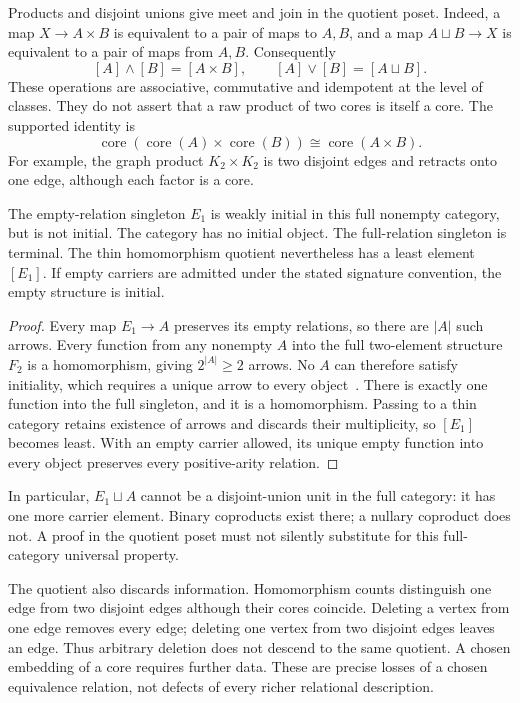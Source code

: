 Products and disjoint unions give meet and join in the quotient poset. Indeed, a map $X\to A\times B$ is equivalent to a pair of maps to $A,B$, and a map $A\sqcup B\to X$ is equivalent to a pair of maps from $A,B$. Consequently
\[
 [A]\wedge[B]=[A\times B],\qquad [A]\vee[B]=[A\sqcup B].
\]
These operations are associative, commutative and idempotent at the level of classes. They do not assert that a raw product of two cores is itself a core. The supported identity is
\[
 \operatorname{core}(\operatorname{core}(A)\times\operatorname{core}(B))
 \cong\operatorname{core}(A\times B).
\]
For example, the graph product $K_2\times K_2$ is two disjoint edges and retracts onto one edge, although each factor is a core.

\begin{proposition}
The empty-relation singleton $E_1$ is weakly initial in this full nonempty category, but is not initial. The category has no initial object. The full-relation singleton is terminal. The thin homomorphism quotient nevertheless has a least element $[E_1]$. If empty carriers are admitted under the stated signature convention, the empty structure is initial.
\end{proposition}
\begin{proof}
Every map $E_1\to A$ preserves its empty relations, so there are $|A|$ such arrows. Every function from any nonempty $A$ into the full two-element structure $F_2$ is a homomorphism, giving $2^{|A|}\ge2$ arrows. No $A$ can therefore satisfy initiality, which requires a unique arrow to every object~\cite{stacksinitial}. There is exactly one function into the full singleton, and it is a homomorphism. Passing to a thin category retains existence of arrows and discards their multiplicity, so $[E_1]$ becomes least. With an empty carrier allowed, its unique empty function into every object preserves every positive-arity relation.
\end{proof}

In particular, $E_1\sqcup A$ cannot be a disjoint-union unit in the full category: it has one more carrier element. Binary coproducts exist there; a nullary coproduct does not. A proof in the quotient poset must not silently substitute for this full-category universal property.

The quotient also discards information. Homomorphism counts distinguish one edge from two disjoint edges although their cores coincide. Deleting a vertex from one edge removes every edge; deleting one vertex from two disjoint edges leaves an edge. Thus arbitrary deletion does not descend to the same quotient. A chosen embedding of a core requires further data. These are precise losses of a chosen equivalence relation, not defects of every richer relational description.

